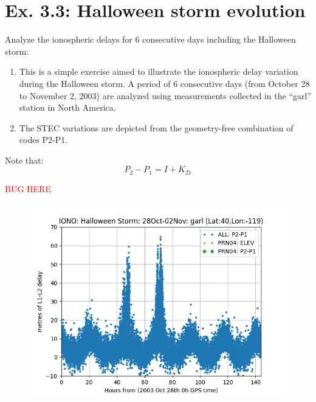 \section{Ex. 3.3: Halloween storm evolution}

Analyze the ionospheric delays for 6 consecutive days including the Halloween storm:

\begin{enumerate}
\item This is a simple exercise aimed to illustrate the ionospheric delay variation during the Halloween storm. A period of 6 consecutive days (from October 28 to November 2, 2003) are analyzed using measurements collected in the “garl” station in North America.
\item The STEC variations are depicted from the geometry-free combination of codes P2-P1.
\end{enumerate}

Note that:
\begin{equation}\label{Geometry free combination}
    P_{2}-P_{1} = I +K_{21}
\end{equation}


\textcolor{red}{BUG HERE}
\begin{figure}[H]
        \centering
        \includegraphics[scale=0.52]{sources/Figures/FIG_2/TUT2_Ex3.3c.png}
        \caption{}
        \label{fig:}
\end{figure}

